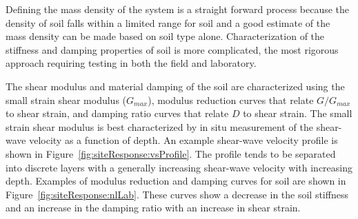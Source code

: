 \documentclass[12pt,oneside]{book}
\begin{document}
Defining the mass density of the system is a straight forward process because the density of soil falls
within a limited range for soil and a good estimate of the mass density can be made based on soil
type alone.  Characterization of the stiffness and damping properties of soil is more complicated,
the most rigorous approach requiring testing in both the field and laboratory.  

The shear modulus and material damping of the soil are characterized using the small strain shear
modulus ($G_{max}$), modulus reduction curves that relate $G/G_{max}$ to shear strain, and damping
ratio curves that relate $D$ to shear strain.  The small strain shear modulus is best
characterized by in situ measurement of the shear-wave velocity as a function of depth.  An example
shear-wave velocity profile is shown in Figure~\ref{fig:siteResponse:vsProfile}. The profile tends to be
separated into discrete layers with a generally increasing shear-wave velocity with increasing
depth.  Examples of modulus reduction and damping curves for soil are shown in
Figure~\ref{fig:siteResponse:nlLab}.  These curves show a decrease in the soil stiffness and an
increase in the damping ratio with an increase in shear strain. 
\end{document}
